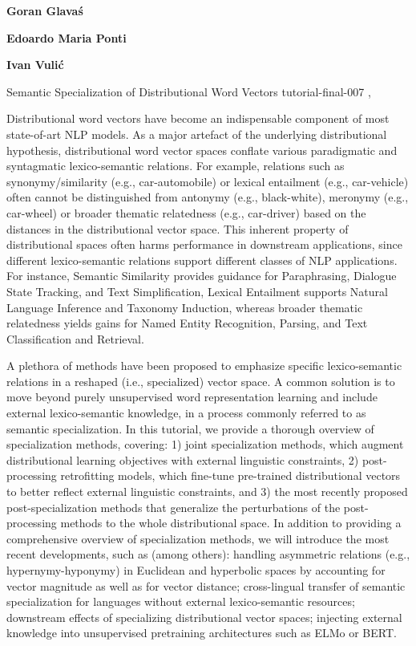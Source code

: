\begin{bio}
\small
\textbf{Goran Glavaś} 

\textbf{Edoardo Maria Ponti} 

\textbf{Ivan Vulić} 

\end{bio}

\begin{tutorial}{Semantic Specialization of Distributional Word Vectors}
  {tutorial-final-007}
  {\daydateyear, \tutorialafternoontime}
  {\TutLocG}

Distributional word vectors have become an indispensable component of most state-of-art NLP models. As a major artefact of the underlying distributional hypothesis, distributional word vector spaces conflate various paradigmatic and syntagmatic lexico-semantic relations. For example, relations such as synonymy/similarity (e.g., car-automobile) or lexical entailment (e.g., car-vehicle) often cannot be distinguished from antonymy (e.g., black-white), meronymy (e.g., car-wheel) or broader thematic relatedness (e.g., car-driver) based on the distances in the distributional vector space. This inherent property of distributional spaces often harms performance in downstream applications, since different lexico-semantic relations support different classes of NLP applications. For instance, Semantic Similarity provides guidance for Paraphrasing, Dialogue State Tracking, and Text Simplification, Lexical Entailment supports Natural Language Inference and Taxonomy Induction, whereas broader thematic relatedness yields gains for Named Entity Recognition, Parsing, and Text Classification and Retrieval.

A plethora of methods have been proposed to emphasize specific lexico-semantic relations in a reshaped (i.e., specialized) vector space. A common solution is to move beyond purely unsupervised word representation learning and include external lexico-semantic knowledge, in a process commonly referred to as semantic specialization. In this tutorial, we provide a thorough overview of specialization methods, covering: 1) joint specialization methods, which augment distributional learning objectives with external linguistic constraints, 2) post-processing retrofitting models, which fine-tune pre-trained distributional vectors to better reflect external linguistic constraints, and 3) the most recently proposed post-specialization methods that generalize the perturbations of the post-processing methods to the whole distributional space. In addition to providing a comprehensive overview of specialization methods, we will introduce the most recent developments, such as (among others): handling asymmetric relations (e.g., hypernymy-hyponymy) in Euclidean and hyperbolic spaces by accounting for vector magnitude as well as for vector distance; cross-lingual transfer of semantic specialization for languages without external lexico-semantic resources; downstream effects of specializing distributional vector spaces; injecting external knowledge into unsupervised pretraining architectures such as ELMo or BERT.

\end{tutorial}
